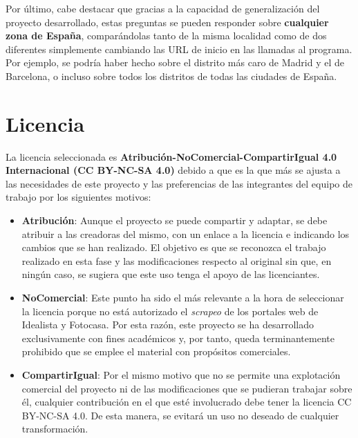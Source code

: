 \documentclass[12pt]{article}
\begin{document}
Por último, cabe destacar que gracias a la capacidad de generalización del proyecto desarrollado, estas preguntas se pueden responder sobre \textbf{cualquier zona de España}, comparándolas tanto de la misma localidad como de dos diferentes simplemente cambiando las URL de inicio en las llamadas al programa. Por ejemplo, se podría haber hecho sobre el distrito más caro de Madrid y el de Barcelona, o incluso sobre todos los distritos de todas las ciudades de España.

\vspace{-1.5em}\section{Licencia}\vspace{-1em}

La licencia seleccionada es\textbf{ Atribución-NoComercial-CompartirIgual 4.0 Internacional (CC BY-NC-SA 4.0)} debido a que es la que más se ajusta a las necesidades de este proyecto y las preferencias de las integrantes del equipo de trabajo por los siguientes motivos:

\begin{itemize}[topsep=0cm,partopsep=0cm]
	\item \textbf{Atribución}: Aunque el proyecto se puede compartir y adaptar, se debe atribuir a las creadoras del mismo, con un enlace a la licencia e indicando los cambios que se han realizado. El objetivo es que se reconozca el trabajo realizado en esta fase y las modificaciones respecto al original sin que, en ningún caso, se sugiera que este uso tenga el apoyo de las licenciantes.  
	
	\item \textbf{NoComercial}: Este punto ha sido el más relevante a la hora de seleccionar la licencia porque no está autorizado el \textit{scrapeo} de los portales web de Idealista y Fotocasa. Por esta razón, este proyecto se ha desarrollado exclusivamente con fines académicos y, por tanto, queda terminantemente prohibido que se emplee el material con propósitos comerciales. 
	
	\item \textbf{CompartirIgual}: Por el mismo motivo que no se permite una explotación comercial del proyecto ni de las modificaciones que se pudieran trabajar sobre él, cualquier contribución en el que esté involucrado debe tener la licencia CC BY-NC-SA 4.0. De esta manera, se evitará un uso no deseado de cualquier transformación.
\end{itemize}
\end{document}
